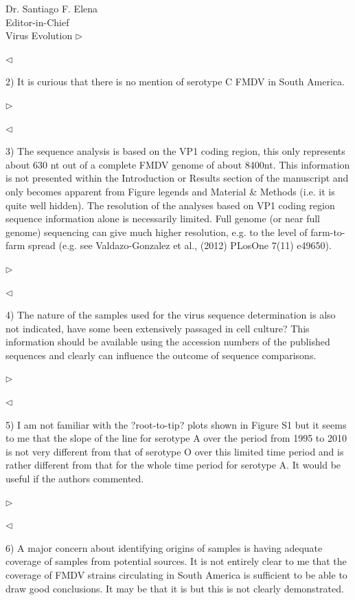 \documentclass[ucla,biomath,12pt,noaddrfooter,datefrom]{UC_letter}
\newenvironment{reply}{$\triangleright$\bf}{$\triangleleft$}
\begin{document}
\begin{letter}{
Dr. Santiago F. Elena \\
Editor-in-Chief \\
Virus Evolution
}
\begin{reply}

\end{reply}

2)      It is curious that there is no mention of serotype C FMDV in South America.

\begin{reply}

\end{reply}

3)      The sequence analysis is based on the VP1 coding region, this only represents about 630 nt out of a complete FMDV genome of about 8400nt. 
This information is not presented within the Introduction or Results section of the manuscript and only becomes apparent from Figure legends and Material \& Methods (i.e. it is quite well hidden). 
The resolution of the analyses based on VP1 coding region sequence information alone is necessarily limited. 
Full genome (or near full genome) sequencing can give much higher resolution, e.g. to the level of farm-to-farm spread (e.g. see Valdazo-Gonzalez et al., (2012) PLosOne 7(11) e49650).

\begin{reply}

\end{reply}

4)      The nature of the samples used for the virus sequence determination is also not indicated, have some been extensively passaged in cell culture? 
This information should be available using the accession numbers of the published sequences and clearly can influence the outcome of sequence comparisons.

\begin{reply}

\end{reply}

5)      I am not familiar with the ?root-to-tip? plots shown in Figure S1 but it seems to me that the slope of the line for serotype A over the period from 1995 to 2010 is not very different from that of serotype O over this limited time period and is rather different from that for the whole time period for serotype A. 
It would be useful if the authors commented.

\begin{reply}

\end{reply}

6)      A major concern about identifying origins of samples is having adequate coverage of samples from potential sources. 
It is not entirely clear to me that the coverage of FMDV strains circulating in South America is sufficient to be able to draw good conclusions. 
It may be that it is but this is not clearly demonstrated.


\end{letter}
\end{document}

